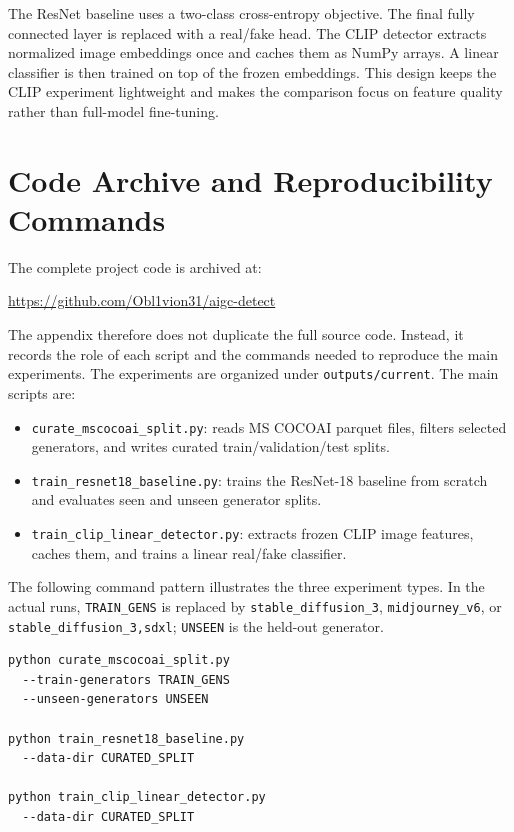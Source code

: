 \documentclass[conference]{IEEEtran}
\begin{document}
The ResNet baseline uses a two-class cross-entropy objective. The final fully
connected layer is replaced with a real/fake head. The CLIP detector extracts
normalized image embeddings once and caches them as NumPy arrays. A linear
classifier is then trained on top of the frozen embeddings. This design keeps
the CLIP experiment lightweight and makes the comparison focus on feature
quality rather than full-model fine-tuning.

\section{Code Archive and Reproducibility Commands}

The complete project code is archived at:
\begin{center}
\url{https://github.com/Obl1vion31/aigc-detect}
\end{center}
The appendix therefore does not duplicate the full source code. Instead, it
records the role of each script and the commands needed to reproduce the main
experiments. The experiments are organized under \texttt{outputs/current}. The
main scripts are:
\begin{itemize}
    \item \texttt{curate\_mscocoai\_split.py}: reads MS COCOAI parquet files,
    filters selected generators, and writes curated train/validation/test
    splits.
    \item \texttt{train\_resnet18\_baseline.py}: trains the ResNet-18 baseline
    from scratch and evaluates seen and unseen generator splits.
    \item \texttt{train\_clip\_linear\_detector.py}: extracts frozen CLIP image
    features, caches them, and trains a linear real/fake classifier.
\end{itemize}

The following command pattern illustrates the three experiment types. In the
actual runs, \texttt{TRAIN\_GENS} is replaced by \texttt{stable\_diffusion\_3},
\texttt{midjourney\_v6}, or \texttt{stable\_diffusion\_3,sdxl}; \texttt{UNSEEN}
is the held-out generator.
\begin{verbatim}
python curate_mscocoai_split.py
  --train-generators TRAIN_GENS
  --unseen-generators UNSEEN

python train_resnet18_baseline.py
  --data-dir CURATED_SPLIT

python train_clip_linear_detector.py
  --data-dir CURATED_SPLIT
\end{verbatim}
\end{document}
